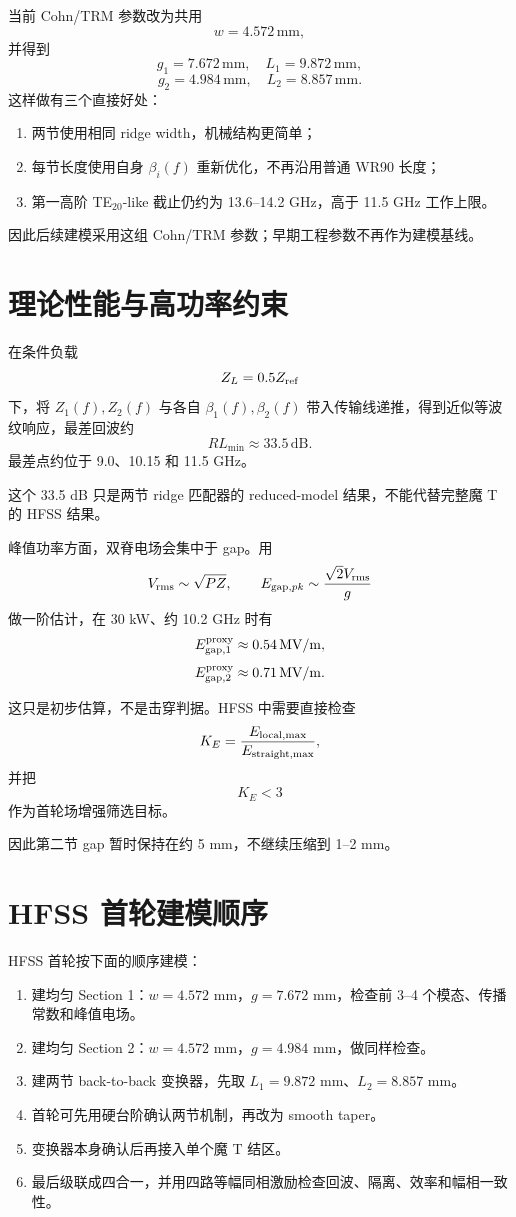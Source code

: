 \documentclass[11pt,a4paper]{ctexart}
\begin{document}
当前 Cohn/TRM 参数改为共用
\[
w=4.572\,\mathrm{mm},
\]
并得到
\[
g_1=7.672\,\mathrm{mm},\quad L_1=9.872\,\mathrm{mm},
\]
\[
g_2=4.984\,\mathrm{mm},\quad L_2=8.857\,\mathrm{mm}.
\]
这样做有三个直接好处：

\begin{enumerate}
\item 两节使用相同 ridge width，机械结构更简单；
\item 每节长度使用自身 \(\beta_i(f)\) 重新优化，不再沿用普通 WR90 长度；
\item 第一高阶 TE$_{20}$-like 截止仍约为 13.6--14.2 GHz，高于 11.5 GHz 工作上限。
\end{enumerate}

因此后续建模采用这组 Cohn/TRM 参数；早期工程参数不再作为建模基线。

\section{理论性能与高功率约束}

在条件负载
\[
Z_L=0.5Z_{\rm ref}
\]
下，将 \(Z_1(f),Z_2(f)\) 与各自 \(\beta_1(f),\beta_2(f)\) 带入传输线递推，得到近似等波纹响应，最差回波约
\[
\boxed{RL_{\min}\approx33.5\,\mathrm{dB}}.
\]
最差点约位于 9.0、10.15 和 11.5 GHz。

这个 33.5 dB 只是两节 ridge 匹配器的 reduced-model 结果，不能代替完整魔 T 的 HFSS 结果。

峰值功率方面，双脊电场会集中于 gap。用
\[
V_{\rm rms}\sim\sqrt{PZ},
\qquad
E_{{\rm gap},pk}\sim\frac{\sqrt2V_{\rm rms}}{g}
\]
做一阶估计，在 30 kW、约 10.2 GHz 时有
\[
E_{{\rm gap},1}^{\rm proxy}\approx0.54\,\mathrm{MV/m},
\]
\[
E_{{\rm gap},2}^{\rm proxy}\approx0.71\,\mathrm{MV/m}.
\]

这只是初步估算，不是击穿判据。HFSS 中需要直接检查
\[
K_E
=
\frac{E_{\rm local,max}}{E_{\rm straight,max}},
\]
并把
\[
\boxed{K_E<3}
\]
作为首轮场增强筛选目标。

因此第二节 gap 暂时保持在约 5 mm，不继续压缩到 1--2 mm。

\section{HFSS 首轮建模顺序}

HFSS 首轮按下面的顺序建模：

\begin{enumerate}
\item 建均匀 Section 1：\(w=4.572\) mm，\(g=7.672\) mm，检查前 3--4 个模态、传播常数和峰值电场。
\item 建均匀 Section 2：\(w=4.572\) mm，\(g=4.984\) mm，做同样检查。
\item 建两节 back-to-back 变换器，先取 \(L_1=9.872\) mm、\(L_2=8.857\) mm。
\item 首轮可先用硬台阶确认两节机制，再改为 smooth taper。
\item 变换器本身确认后再接入单个魔 T 结区。
\item 最后级联成四合一，并用四路等幅同相激励检查回波、隔离、效率和幅相一致性。
\end{enumerate}
\end{document}
